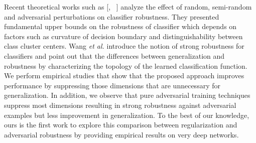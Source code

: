 
Recent theoretical works such as [\cite{fawzi2015analysis}, ~\cite{fawzi2016robustness}] analyze the effect of random, semi-random and adversarial perturbations on classifier robustness. They presented fundamental upper bounds on the robustness of classifier which depends on factors such as curvature of decision boundary and distinguishability between class cluster centers. Wang \emph{et al.} \cite{WangGQ16} introduce the notion of strong robustness for classifiers and point out that the differences between generalization and robustness by characterizing the topology of the learned classification function. We perform empirical studies that show that the proposed approach improves performance by suppressing those dimensions that are unnecessary for generalization. In addition, we observe that pure adversarial training techniques suppress most dimensions resulting in strong robustness against adversarial examples but less improvement in generalization. To the best of our knowledge, ours is the first work to explore this comparison between regularization and adversarial robustness by providing empirical results on very deep networks. 




